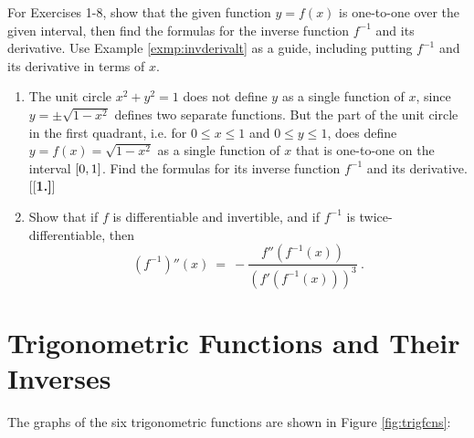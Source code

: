 {\small
{}
\par\noindent For Exercises 1-8, show that the given function $y = f(x)$ is
 one-to-one over the given interval, then find the formulas for the inverse
 function $f^{-1}$ and its derivative. Use Example \ref{exmp:invderivalt} as a
 guide, including putting $f^{-1}$ and its derivative in terms of $x$.
\begin{enumerate}[\bfseries 1.]
 \item The unit circle $x^2 + y^2 = 1$ does not define $y$ as a single function
  of $x$, since $y = \pm \sqrt{1 - x^2}$ defines two separate functions. But
  the part of the unit circle in the first quadrant, i.e. for $0 \le x \le 1$
  and $0 \le y \le 1$, does define $y = f(x) = \sqrt{1 - x^2}$ as a single
  function of $x$ that is one-to-one on the interval $\lbrack 0,1 \rbrack$. Find the
  formulas for its inverse function $f^{-1}$ and its derivative.
[{[\bfseries 1.]}]
 \item Show that if $f$ is differentiable and invertible, and if $f^{-1}$ is
  twice-differentiable, then
  \begin{displaymath}
   \left(f^{-1}\right)''(x) ~=~ -\frac{f''(f^{-1}(x))}{\left(f'(f^{-1}(x))\right)^3} ~.
  \end{displaymath}
\end{enumerate}}
\newpage
\section{Trigonometric Functions and Their Inverses}\label{sec:trig-and-inv-trig-functions}
The graphs of the six trigonometric functions are shown in Figure
\ref{fig:trigfcns}:

